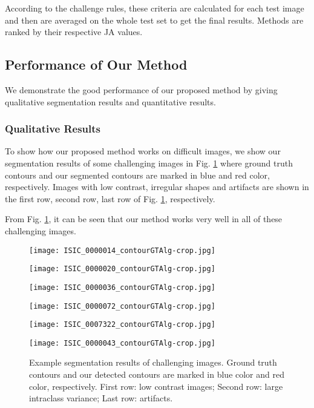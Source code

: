 \documentclass{article}
\begin{document}
According to the challenge rules,
these criteria are calculated for each test image and then are averaged
on the whole test set to get the final
results. Methods are ranked by their respective JA values.

\subsection{Performance of Our Method}
We demonstrate the good performance of our proposed method by giving qualitative segmentation results and quantitative results.
\subsubsection{Qualitative Results}
To show how our proposed method works on difficult images, we show our segmentation results of some challenging images in Fig. \ref{fig:qualitative} where ground truth contours and our segmented contours are marked in blue and red color, respectively. Images with low contrast, irregular shapes and artifacts are shown in the first row, second row, last row of Fig. \ref{fig:qualitative}, respectively. 

From Fig. \ref{fig:qualitative}, it can be seen that our method works very well 
in all of these challenging images.
\begin{figure}[htb]
\begin{minipage}[b]{.48\linewidth}
  \centering
  \centerline{\texttt{[image: ISIC\_0000014\_contourGTAlg-crop.jpg]}}
\end{minipage}
\begin{minipage}[b]{.48\linewidth}
  \centering
  \centerline{\texttt{[image: ISIC\_0000020\_contourGTAlg-crop.jpg]}}
\end{minipage}
\hfill
\begin{minipage}[b]{0.48\linewidth}
  \centering
  \centerline{\texttt{[image: ISIC\_0000036\_contourGTAlg-crop.jpg]}}
\end{minipage}
\begin{minipage}[b]{0.48\linewidth}
  \centering
  \centerline{\texttt{[image: ISIC\_0000072\_contourGTAlg-crop.jpg]}}
\end{minipage}
\begin{minipage}[b]{0.48\linewidth}
  \centering
  \centerline{\texttt{[image: ISIC\_0007322\_contourGTAlg-crop.jpg]}}
\end{minipage}
\hfill
\begin{minipage}[b]{0.48\linewidth}
  \centering
  \centerline{\texttt{[image: ISIC\_0000043\_contourGTAlg-crop.jpg]}}
\end{minipage}
\caption{Example segmentation results of challenging images. Ground truth contours and our detected contours are marked in blue color and red color, respectively. First row: low contrast images; Second row: large intraclass variance; Last row: artifacts.}
\label{fig:qualitative}
\end{figure}
\end{document}
